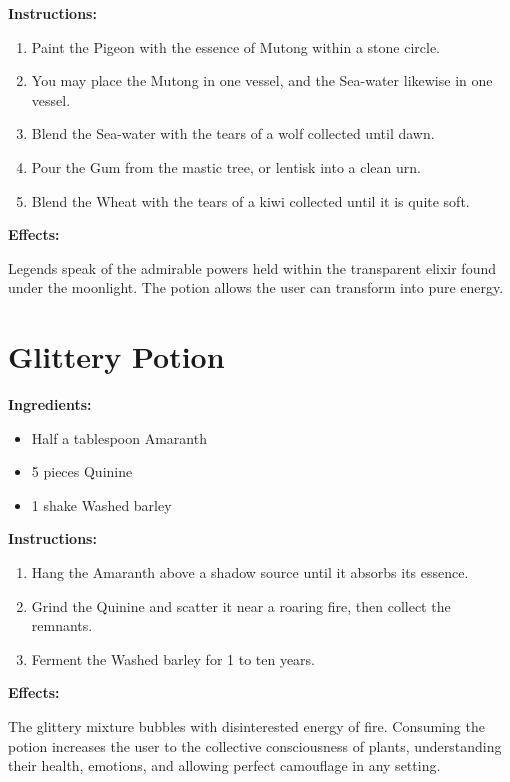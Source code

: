\documentclass{article}
\begin{document}
\textbf{Instructions:}

\begin{enumerate}
  \item Paint the Pigeon with the essence of Mutong within a stone circle.
  \item You may place the Mutong in one vessel, and the Sea-water likewise in one vessel.
  \item Blend the Sea-water with the tears of a wolf collected until dawn.
  \item Pour the Gum from the mastic tree, or lentisk into a clean urn.
  \item Blend the Wheat with the tears of a kiwi collected until it is quite soft.
\end{enumerate}

\textbf{Effects:}

Legends speak of the admirable powers held within the transparent elixir found under the moonlight. The potion allows the user can transform into pure energy.

\newpage
\section*{Glittery Potion}

\textbf{Ingredients:}

\begin{itemize}
  \item Half a tablespoon Amaranth
  \item 5 pieces Quinine
  \item 1 shake Washed barley
\end{itemize}

\textbf{Instructions:}

\begin{enumerate}
  \item Hang the Amaranth above a shadow source until it absorbs its essence.
  \item Grind the Quinine and scatter it near a roaring fire, then collect the remnants.
  \item Ferment the Washed barley for 1 to ten years.
\end{enumerate}

\textbf{Effects:}

The glittery mixture bubbles with disinterested energy of fire. Consuming the potion increases the user to the collective consciousness of plants, understanding their health, emotions, and allowing perfect camouflage in any setting.
\end{document}
